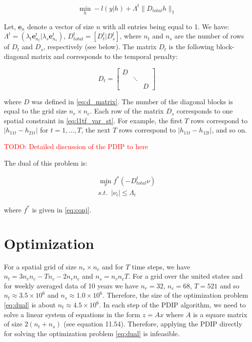 \documentclass{article}
\newcommand{\attn}[1]{\textcolor{red}{TODO: #1}}
\begin{document}
\begin{equation}
\min_h -l(y|h)+ \Lambda^t \lVert D_{total}h \lVert_1
\label{eq:l1tf_var_st_mat}
\end{equation}

Let, $\textbf{e}_n$ denote a vector of size $n$ with all entries being equal to 1. We have: $\Lambda^t=(\lambda_t\textbf{e}_{n_t}^t|\lambda_s\textbf{e}_{n_s}^t)$, $D_{total}^t=[D_{t}^t|D_{s}^t]$, where $n_t$ and $n_s$ are the number of rows of $D_{t}$ and $D_{s}$, respectively (see below). The matrix $D_t$ is the following block-diagonal matrix and corresponds to the temporal penalty:

\begin{equation}
D_t=\begin{bmatrix}
D &  & \\ 
 & \ddots & \\
 &  & D
\end{bmatrix}
\label{eq:d_t_matrix}
\end{equation}

 where $D$ was defined in \eqref{eq:d_matrix}. The number of the diagonal blocks is equal to the grid size $n_r \times n_c$. Each row of the matrix $D_s$ corresponds to one spatial constraint in \eqref{eq:l1tf_var_st}. For example, the first $T$ rows correspond to $|h_{11t}-h_{21t}|$ for $t=1,...,T$, the next $T$ rows correspond to $|h_{11t}-h_{12t}|$, and so on.

\attn{Detailed discussion of the PDIP to here}

The dual of this problem is:

\begin{equation}
\begin{aligned}
\min_\nu f^*(-D_{total}^t\mathsf{\nu}) \\
s.t. \,\,\, | \nu_i | \le \Lambda_i
\end{aligned}
\label{eq:dual}
\end{equation}

 where $f^*$ is given in \eqref{eq:conj}.


\section{Optimization}
For a spatial grid of size $n_r \times n_c$ and for $T$ time steps, we have $n_t=3n_rn_c-Tn_c-2n_rn_c$ and $n_s=n_rn_cT$. For a grid over the united states and for weekly averaged data of 10 years we have $n_r=32$, $n_c=68$, $T=521$ and so $n_t\approx 3.5\times10^6$ and $n_s \approx 1.0\times10^6$. Therefore, the size of the optimization problem \eqref{eq:dual} is about $n_t\approx 4.5\times10^6$. In each step of the PDIP algorithm, we need to solve a linear system of equations in the form $z=Ax$ where $A$ is a square matrix of size $2(n_t+n_s)$ (see \citep{boyd_convex_2004} equation 11.54). Therefore, applying the PDIP directly for solving the optimization problem \eqref{eq:dual} is infeasible.
\end{document}
